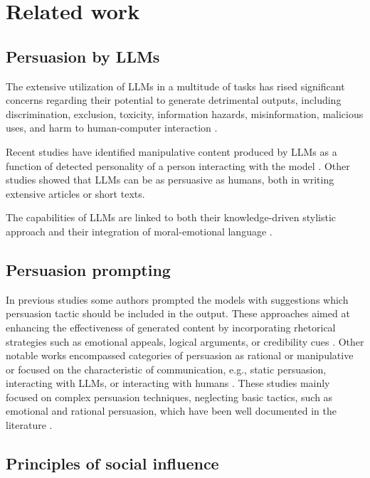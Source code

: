 \section{Related work}
\subsection{Persuasion by LLMs}

The extensive utilization of LLMs in a multitude of tasks has rised significant concerns regarding their potential to generate detrimental outputs, including discrimination, exclusion, toxicity, information hazards, misinformation, malicious uses, and harm to human-computer interaction \cite{weidinger2021ethical}. 

Recent studies have identified manipulative content produced by LLMs as a function of detected personality of a person interacting with the model \cite{mieleszczenko2024dark}. Other studies \cite{goldstein2024persuasive,karinshak2023working} showed that LLMs can be as persuasive as humans, both in writing extensive articles or short texts. 

The capabilities of LLMs are linked to both their knowledge-driven stylistic approach and their integration of moral-emotional language \cite{carrasco2024large,breum2024persuasive,wilczynski2024resistance}.

\subsection{{Persuasion prompting}}

In previous studies some authors prompted the models with suggestions which persuasion tactic should be included in the output\cite{carrasco2024large,zeng2024johnny,pauli2024measuring}.  These approaches aimed at enhancing the effectiveness of generated content by incorporating rhetorical strategies such as emotional appeals, logical arguments, or credibility cues \cite{wilczynski2024resistance}.
Other notable works encompassed categories of persuasion as rational or manipulative \cite{pauli2024measuring} or focused on the characteristic of communication, e.g., static persuasion, interacting with LLMs, or interacting with humans \cite{jones2024lies}.  
These studies mainly focused on complex persuasion techniques, neglecting basic tactics, such as emotional and rational persuasion, which have been well documented in the literature \cite{rosselli1995processing,miceli2006emotional}. 

\subsection{Principles of social influence}


